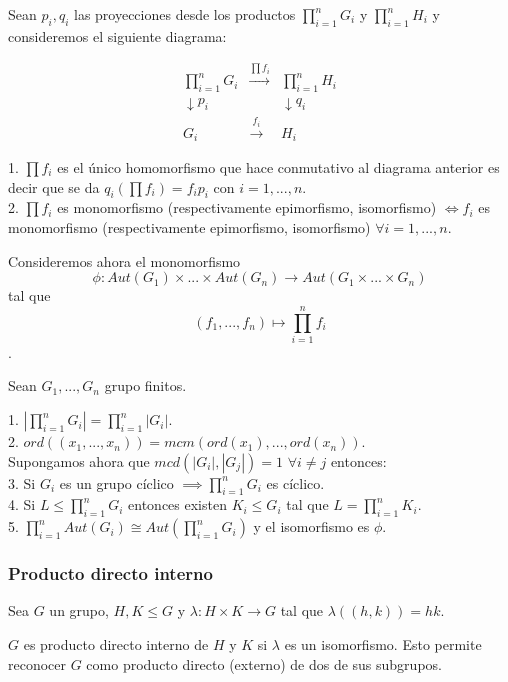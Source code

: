 Sean $p_i,q_i$ las proyecciones desde los productos $\prod_{i=1}^{n} G_i$ y $\prod_{i=1}^{n} H_i$ y consideremos el siguiente diagrama:

$$
\begin{matrix}
\prod_{i=1}^{n} G_i&\stackrel{\prod f_i}{\longrightarrow}&\prod_{i=1}^{n} H_i\\
\downarrow{p_i}&&\downarrow{q_i}\\
G_i&\stackrel{f_i}{\longrightarrow}&H_i
\end{matrix}
$$

\begin{proposition}
1. $\prod f_i$ es el único homomorfismo que hace conmutativo al diagrama anterior es decir que se da $q_i(\prod f_i) = f_i p_i$ con $i=1,...,n$.\\
2. $\prod f_i$ es monomorfismo (respectivamente epimorfismo, isomorfismo) $\iff f_i$ es monomorfismo (respectivamente epimorfismo, isomorfismo) $\forall i=1,...,n$.
\end{proposition}

Consideremos ahora el monomorfismo $$\phi:Aut(G_1) \times ... \times Aut(G_n) \rightarrow Aut(G_1 \times ... \times G_n)$$ tal que $$(f_1,...,f_n) \mapsto \prod_{i=1}^{n} f_i$$.

\begin{theorem}
Sean $G_1,...,G_n$ grupo finitos.

1. $|\prod_{i=1}^{n} G_i| = \prod_{i=1}^{n} |G_i|$.\\
2. $ord((x_1,...,x_n)) = mcm(ord(x_1),...,ord(x_n))$.\\
Supongamos ahora que $mcd(|G_i|,|G_j|) = 1$ $\forall i \neq j$ entonces:\\
3. Si $G_i$ es un grupo cíclico $\implies \prod_{i=1}^{n} G_i$ es cíclico.\\
4. Si $L \le \prod_{i=1}^{n} G_i$ entonces existen $K_i \le G_i$ tal que $L = \prod_{i=1}^{n} K_i$.\\
5. $\prod_{i=1}^{n} Aut(G_i) \cong Aut(\prod_{i=1}^{n} G_i)$ y el isomorfismo es $\phi$.
\end{theorem}

\subsubsection{Producto directo interno}

\begin{definition}
Sea $G$ un grupo, $H,K \le G$ y $\lambda:H \times K \rightarrow G$ tal que $\lambda((h,k)) = hk$.

$G$ es producto directo interno de $H$ y $K$ si $\lambda$ es un isomorfismo. Esto permite reconocer $G$ como producto directo (externo) de dos de sus subgrupos.
\end{definition}

